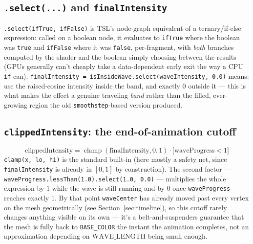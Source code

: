 \documentclass[11pt]{article}
\newcommand{\code}[1]{\texttt{#1}}
\newcommand{\func}[1]{\texttt{\textbf{#1}}}
\begin{document}
\subsection*{\func{.select(...)} and \code{finalIntensity}}
\code{.select(ifTrue, ifFalse)} is TSL's node-graph equivalent of a ternary/if-else
expression: called on a boolean node, it evaluates to \code{ifTrue} where the boolean was
\code{true} and \code{ifFalse} where it was \code{false}, per-fragment, with \emph{both}
branches computed by the shader and the boolean simply choosing between the results (GPUs
generally can't cheaply take a data-dependent early exit the way a CPU \code{if} can).
\code{finalIntensity = isInsideWave.select(waveIntensity, 0.0)} means: use the raised-cosine
intensity inside the band, and exactly $0$ outside it --- this is what makes the effect a
genuine traveling \emph{band} rather than the filled, ever-growing region the old
\code{smoothstep}-based version produced.

\subsection*{\code{clippedIntensity}: the end-of-animation cutoff}
\[
  \text{clippedIntensity} = \operatorname{clamp}(\text{finalIntensity}, 0, 1)
    \cdot \bigl[\text{waveProgress} < 1\bigr]
\]
\code{clamp(x, lo, hi)} is the standard built-in (here mostly a safety net, since
\code{finalIntensity} is already in $[0,1]$ by construction). The second factor ---
\code{waveProgress.lessThan(1.0).select(1.0, 0.0)} --- multiplies the whole expression by
$1$ while the wave is still running and by $0$ once \code{waveProgress} reaches exactly
$1$. By that point \code{waveCenter} has already moved past every vertex on the mesh
geometrically (see Section~\ref{sec:timeline}), so this cutoff rarely changes anything
visible on its own --- it's a belt-and-suspenders guarantee that the mesh is fully back to
\code{BASE\_COLOR} the instant the animation completes, not an approximation depending on
$\text{WAVE\_LENGTH}$ being small enough.
\end{document}
